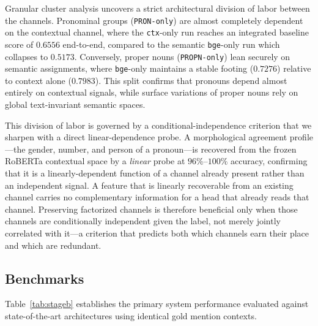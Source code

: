 \documentclass[12pt]{article}
\begin{document}
	Granular cluster analysis uncovers a strict architectural division of labor between the channels. Pronominal groups (\texttt{PRON-only}) are almost completely dependent on the contextual channel, where the \texttt{ctx}-only run reaches an integrated baseline score of $0.6556$ end-to-end, compared to the semantic \texttt{bge}-only run which collapses to $0.5173$. Conversely, proper nouns (\texttt{PROPN-only}) lean securely on semantic assignments, where \texttt{bge}-only maintains a stable footing ($0.7276$) relative to context alone ($0.7983$). This split confirms that pronouns depend almost entirely on contextual signals, while surface variations of proper nouns rely on global text-invariant semantic spaces.
	
	This division of labor is governed by a conditional-independence criterion that we sharpen with a direct linear-dependence probe. A morphological agreement profile---the gender, number, and person of a pronoun---is recovered from the frozen RoBERTa contextual space by a \emph{linear} probe at $96\%\text{--}100\%$ accuracy, confirming that it is a linearly-dependent function of a channel already present rather than an independent signal. A feature that is linearly recoverable from an existing channel carries no complementary information for a head that already reads that channel. Preserving factorized channels is therefore beneficial only when those channels are conditionally independent given the label, not merely jointly correlated with it---a criterion that predicts both which channels earn their place and which are redundant.
	
	\subsection{Benchmarks}
	Table~\ref{tab:stageb} establishes the primary system performance evaluated against state-of-the-art architectures using identical gold mention contexts.
	
\end{document}

